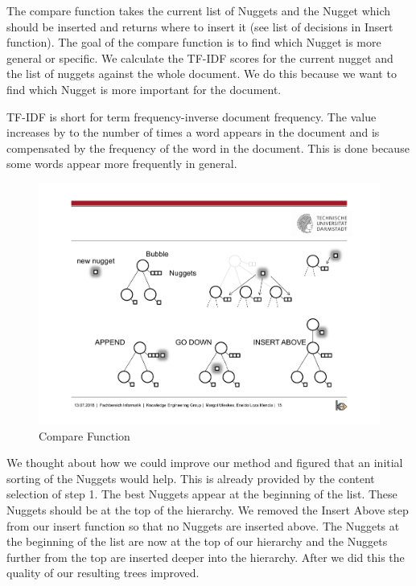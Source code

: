 
The compare function takes the current list of Nuggets and the Nugget which should be inserted and returns where to insert it (see list of decisions in Insert function). The goal of the compare function is to find which Nugget is more general or specific. We calculate the TF-IDF scores for the current nugget and the list of nuggets against the whole document. We do this because we want to find which Nugget is more important for the document.

TF-IDF is short for term frequency-inverse document frequency. The value increases by to the number of times a word appears in the document and is compensated by the frequency of the word in the document. This is done because some words appear more frequently in general. 




\begin{figure}[H]
	\centering
	\includegraphics[trim=22.5cm 12.5cm 2.5cm 5.5cm, clip=true]{img/step2_func.pdf}
	\caption{Compare Function}
	\label{fig:compare}
\end{figure}


We thought about how we could improve our method and figured that an initial sorting of the Nuggets would help. This is already provided by the content selection of step 1. The best Nuggets appear at the beginning of the list. These Nuggets should be at the top of the hierarchy. We removed the Insert Above step from our insert function so that no Nuggets are inserted above. The Nuggets at the beginning of the list are now at the top of our hierarchy and the Nuggets further from the top are inserted deeper into the hierarchy. After we did this the quality of our resulting trees improved.

